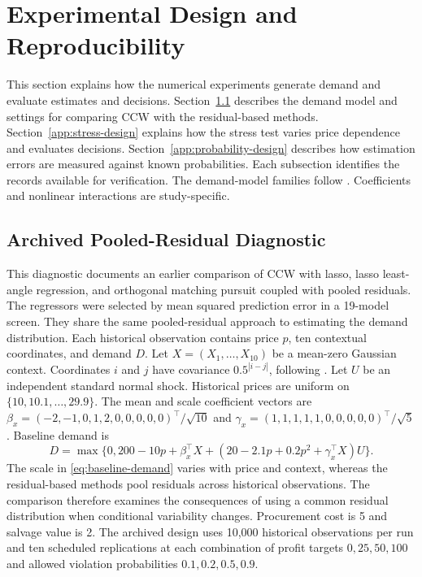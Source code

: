 \section{Experimental Design and Reproducibility}\label{app:experimental-detail}

This section explains how the numerical experiments generate demand and evaluate estimates and decisions. Section~\ref{app:baseline-design} describes the demand model and settings for comparing CCW with the residual-based methods. Section~\ref{app:stress-design} explains how the stress test varies price dependence and evaluates decisions. Section~\ref{app:probability-design} describes how estimation errors are measured against known probabilities. Each subsection identifies the records available for verification. The demand-model families follow \citet{harsha2021prescriptive,serrano2024bilevel}. Coefficients and nonlinear interactions are study-specific.

\subsection{Archived Pooled-Residual Diagnostic}\label{app:baseline-design}

This diagnostic documents an earlier comparison of CCW with lasso, lasso least-angle regression, and orthogonal matching pursuit coupled with pooled residuals. The regressors were selected by mean squared prediction error in a 19-model screen. They share the same pooled-residual approach to estimating the demand distribution. Each historical observation contains price $p$, ten contextual coordinates, and demand $D$. Let $X=(X_1,\ldots,X_{10})$ be a mean-zero Gaussian context. Coordinates $i$ and $j$ have covariance $0.5^{|i-j|}$, following \citet{serrano2024bilevel}. Let $U$ be an independent standard normal shock. Historical prices are uniform on $\{10,10.1,\ldots,29.9\}$. The mean and scale coefficient vectors are $\beta_x=(-2,-1,0,1,2,0,0,0,0,0)^\top/\sqrt{10}$ and
$\gamma_x=(1,1,1,1,1,0,0,0,0,0)^\top/\sqrt5$. Baseline demand is
\begin{equation}\label{eq:baseline-demand}
 D=\max\{0,200-10p+\beta_x^\top X+
 (20-2.1p+0.2p^2+\gamma_x^\top X)U\}.
\end{equation}
The scale in \eqref{eq:baseline-demand} varies with price and context, whereas the residual-based methods pool residuals across historical observations. The comparison therefore examines the consequences of using a common residual distribution when conditional variability changes. Procurement cost is 5 and salvage value is 2. The archived design uses 10,000 historical observations per run and ten scheduled replications at each combination of profit targets \(0,25,50,100\) and allowed violation probabilities \(0.1,0.2,0.5,0.9\).

